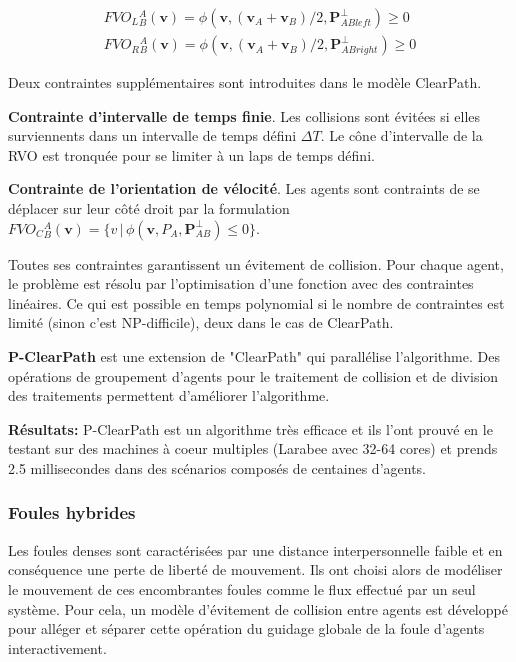 \documentclass[11pt]{article}
\begin{document}
\begin{eqnarray}
FVO_L{}_B^A(\textbf{v}) = \phi(\textbf{v}, (\textbf{v}_A + \textbf{v}_B)/2, \textbf{P}_{ABleft}^\perp) \geq 0 \\
FVO_R{}_B^A(\textbf{v}) = \phi(\textbf{v}, (\textbf{v}_A + \textbf{v}_B)/2, \textbf{P}_{ABright}^\perp) \geq 0 
\end{eqnarray}

Deux contraintes supplémentaires sont introduites dans le modèle ClearPath. 

\textbf{Contrainte d'intervalle de temps finie}. Les collisions sont évitées si elles surviennents dans un intervalle de temps défini $\Delta T$. Le cône d'intervalle de la RVO est tronquée pour se limiter à un laps de temps défini.

\textbf{Contrainte de l'orientation de vélocité}. Les agents sont contraints de se déplacer sur leur côté droit par la formulation $FVO_C{}_B^A(\textbf{v}) = \{v \,|\, \phi(\textbf{v}, P_A, \textbf{P}_{AB}^\perp) \leq 0\}$.

Toutes ses contraintes garantissent un évitement de collision. Pour chaque agent, le problème est résolu par l'optimisation d'une fonction avec des contraintes linéaires. Ce qui est possible en temps polynomial si le nombre de contraintes est limité (sinon c'est NP-difficile), deux dans le cas de ClearPath.

\textbf{P-ClearPath} est une extension de "ClearPath" qui parallélise l'algorithme. Des opérations de groupement d'agents pour le traitement de collision et de division des traitements permettent d'améliorer l'algorithme. 

\textbf{Résultats:} P-ClearPath est un algorithme très efficace et ils l'ont prouvé en le testant sur des machines à coeur multiples (Larabee avec 32-64 cores) et prends 2.5 millisecondes dans des scénarios composés de centaines d'agents.

\subsubsection{Foules hybrides}

Les foules denses sont caractérisées par une distance interpersonnelle faible et en conséquence une perte de liberté de mouvement. Ils ont choisi alors de modéliser le mouvement de ces encombrantes foules comme le flux effectué par un seul système. Pour cela, un modèle d'évitement de collision entre agents est développé pour alléger et séparer cette opération du guidage globale de la foule d'agents interactivement.
\end{document}
